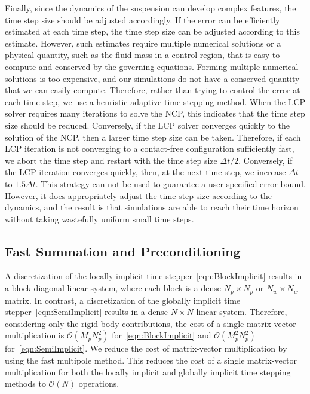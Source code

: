\documentclass[AMA,STIX1COL]{WileyNJD-v2}
\begin{document}
Finally, since the dynamics of the suspension can develop complex
features, the time step size should be adjusted accordingly.  If the
error can be efficiently estimated at each time step, the time step size
can be adjusted according to this estimate.  However, such estimates
require multiple numerical solutions or a physical quantity, such as the
fluid mass in a control region, that is easy to compute and conserved by
the governing equations.  Forming multiple numerical solutions is too
expensive, and our simulations do not have a conserved quantity that we
can easily compute.  Therefore, rather than trying to control the error
at each time step, we use a heuristic adaptive time stepping method.
When the LCP solver requires many iterations to solve the NCP, this
indicates that the time step size should be reduced.  Conversely, if the
LCP solver converges quickly to the solution of the NCP, then a larger
time step size can be taken.  Therefore, if each LCP iteration is not
converging to a contact-free configuration sufficiently fast, we abort
the time step and restart with the time step size $\Delta t/2$.
Conversely, if the LCP iteration converges quickly, then, at the next
time step, we increase $\Delta t$ to $1.5\Delta t$. This strategy can
not be used to guarantee a user-specified error bound.  However, it does
appropriately adjust the time step size according to the dynamics, and
the result is that simulations are able to reach their time horizon
without taking wastefully uniform small time steps.

\subsection{Fast Summation and Preconditioning}
\label{sec:fast}
A discretization of the locally implicit time
stepper~\eqref{eqn:BlockImplicit} results in a block-diagonal linear
system, where each block is a dense $N_p \times N_p$ or $N_w \times N_w$
matrix.  In contrast, a discretization of the globally implicit time
stepper~\eqref{eqn:SemiImplicit} results in a dense $N \times N$ linear
system.  Therefore, considering only the rigid body contributions, the
cost of a single matrix-vector multiplication is $\mathcal{O}(M_p
N_p^2)$ for~\eqref{eqn:BlockImplicit} and $\mathcal{O}(M_p^2 N_p^2)$
for~\eqref{eqn:SemiImplicit}.  We reduce the cost of matrix-vector
multiplication by using the fast multipole method.  This reduces the
cost of a single matrix-vector multiplication for both the locally
implicit and globally implicit time stepping methods to $\mathcal{O}(N)$
operations.
\end{document}

